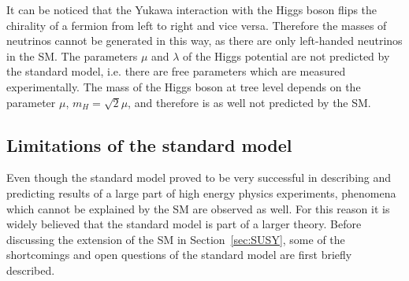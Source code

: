 It can be noticed  that the Yukawa interaction with the Higgs boson flips the chirality of a fermion from left to right and vice versa. Therefore the masses of neutrinos cannot be generated in this way, as there are only left-handed neutrinos in the SM. The parameters $\mu$ and $\lambda$ of the Higgs potential are not predicted by the standard model, i.e. there are free parameters which are measured experimentally. The mass of the Higgs boson at tree level depends on the parameter $\mu$, $m_{H} = \sqrt{2}\mu$, and therefore is as well not predicted by the SM. 


\subsection{Limitations of the standard model~\label{sec:shortcomings}}

Even though the standard model proved to be very successful in describing and predicting results of a large part of high energy physics experiments, phenomena which cannot be explained by the SM are observed as well. For this reason it is widely believed that the standard model is part of a larger theory. Before discussing the extension of the SM in Section~\ref{sec:SUSY}, some of the shortcomings and open questions of the standard model are first briefly described.



